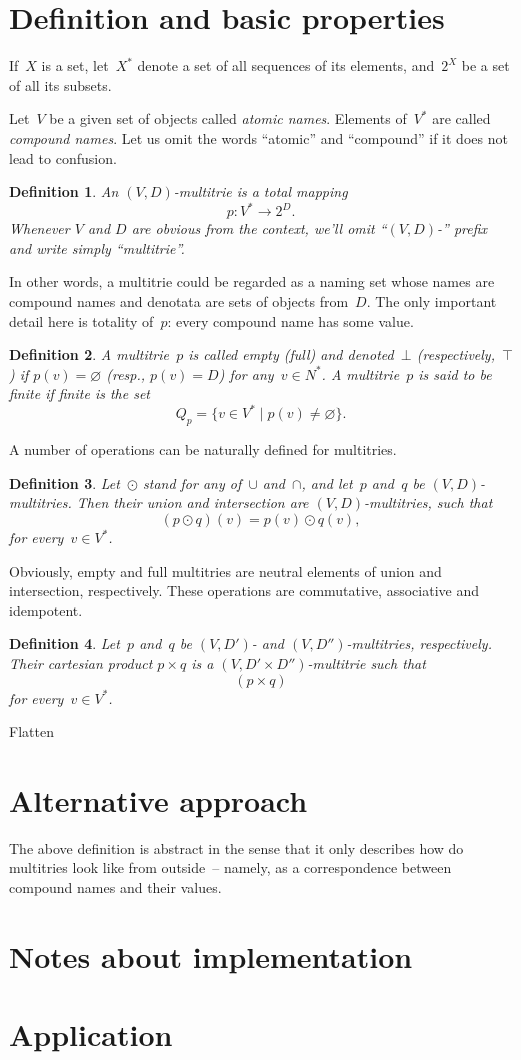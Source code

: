 \documentclass{article}
\newtheorem{Df}{Definition}
\newcommand{\mtempty}{\bot}
\newcommand{\mtfull}{\top}
\begin{document}
\section{Definition and basic properties}

If~$X$ is a set, let~$X^\ast$ denote a set of all sequences of its elements,
and~$2^X$ be a set of all its subsets.

Let~$V$ be a given set of objects called \emph{atomic names}. Elements
of~$V^\ast$ are called \emph{compound names}. Let us omit the words ``atomic''
and ``compound'' if it does not lead to confusion.

\begin{Df}
An \emph{$(V,D)$-multitrie} is a total mapping
\[
  p : V^\ast \to 2^D .
\]
Whenever $V$ and $D$ are obvious from the context, we'll omit ``$(V,D)$-''
prefix and write simply ``multitrie''.
\end{Df}

In other words, a multitrie could be regarded as a naming set whose names are
compound names and denotata are sets of objects from~$D$. The only important
detail here is totality of~$p$: every compound name has some value.

\begin{Df}
A multitrie~$p$ is called \emph{empty} (\emph{full}) and denoted~$\mtempty$
(respectively,~$\mtfull$) if $p(v)=\varnothing$ (resp., $p(v)=D$) for any~$v\in
N^\ast$. A multitrie~$p$ is said to be \emph{finite} if finite is the set
\[
  Q_p = \{ v \in V^\ast \mid p(v) \neq \varnothing \} .
\]
\end{Df}

A number of operations can be naturally defined for multitries.

\begin{Df}
Let~$\odot$ stand for any of~$\cup$ and~$\cap$, and let~$p$ and~$q$ be
$(V,D)$-multitries. Then their \emph{union} and \emph{intersection} are
$(V,D)$-multitries, such that
\[
  (p\odot q)(v) = p(v) \odot q(v) ,
\]
for every~$v\in V^\ast$.
\end{Df}

Obviously, empty and full multitries are neutral elements of union and intersection,
respectively. These operations are commutative, associative and idempotent.

\begin{Df}
Let~$p$ and~$q$ be $(V,D')$- and $(V,D'')$-multitries, respectively. Their
\emph{cartesian product} $p\times q$ is a $(V,D'\times D'')$-multitrie such that
\[
  (p\times q) %
\]
for every~$v\in V^\ast$.
\end{Df}

Flatten

\section{Alternative approach}

The above definition is abstract in the sense that it only describes how do
multitries look like from outside~-- namely, as a correspondence between
compound names and their values.

\section{Notes about implementation}

\section{Application}
\end{document}
